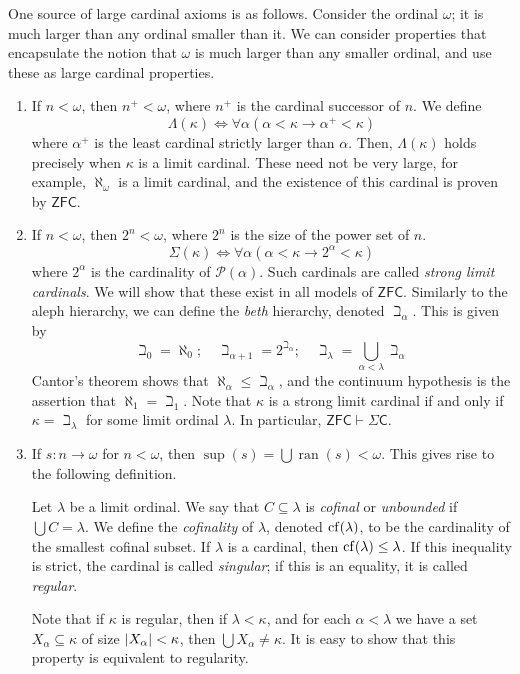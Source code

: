 One source of large cardinal axioms is as follows.
Consider the ordinal \( \omega \); it is much larger than any ordinal smaller than it.
We can consider properties that encapsulate the notion that \( \omega \) is much larger than any smaller ordinal, and use these as large cardinal properties.

\begin{enumerate}
    \item If \( n < \omega \), then \( n^+ < \omega \), where \( n^+ \) is the cardinal successor of \( n \).
    We define
    \[ \Lambda(\kappa) \iff \forall \alpha (\alpha < \kappa \to \alpha^+ < \kappa) \]
    where \( \alpha^+ \) is the least cardinal strictly larger than \( \alpha \).
    Then, \( \Lambda(\kappa) \) holds precisely when \( \kappa \) is a limit cardinal.
    These need not be very large, for example, \( \aleph_\omega \) is a limit cardinal, and the existence of this cardinal is proven by \( \mathsf{ZFC} \).
    \item If \( n < \omega \), then \( 2^n < \omega \), where \( 2^n \) is the size of the power set of \( n \).
    \[ \Sigma(\kappa) \iff \forall \alpha (\alpha < \kappa \to 2^\alpha < \kappa) \]
    where \( 2^\alpha \) is the cardinality of \( \mathcal P(\alpha) \).
    Such cardinals are called \emph{strong limit cardinals}.
    We will show that these exist in all models of \( \mathsf{ZFC} \).
    Similarly to the aleph hierarchy, we can define the \emph{beth} hierarchy, denoted \( \beth_\alpha \).
    This is given by
    \[ \beth_0 = \aleph_0;\quad \beth_{\alpha + 1} = 2^{\beth_\alpha};\quad \beth_{\lambda} = \bigcup_{\alpha < \lambda} \beth_\alpha \]
    Cantor's theorem shows that \( \aleph_\alpha \leq \beth_\alpha \), and the continuum hypothesis is the assertion that \( \aleph_1 = \beth_1 \).
    Note that \( \kappa \) is a strong limit cardinal if and only if \( \kappa = \beth_\lambda \) for some limit ordinal \( \lambda \).
    In particular, \( \mathsf{ZFC} \vdash \Sigma \mathsf{C} \).
    \item If \( s : n \to \omega \) for \( n < \omega \), then \( \sup(s) = \bigcup \operatorname{ran}(s) < \omega \).
    This gives rise to the following definition.
    \begin{definition}
        Let \( \lambda \) be a limit ordinal.
        We say that \( C \subseteq \lambda \) is \emph{cofinal} or \emph{unbounded} if \( \bigcup C = \lambda \).
        We define the \emph{cofinality} of \( \lambda \), denoted \( \operatorname{cf}(\lambda) \), to be the cardinality of the smallest cofinal subset.
        If \( \lambda \) is a cardinal, then \( \operatorname{cf}(\lambda) \leq \lambda \).
        If this inequality is strict, the cardinal is called \emph{singular}; if this is an equality, it is called \emph{regular}.
    \end{definition}
    Note that if \( \kappa \) is regular, then if \( \lambda < \kappa \), and for each \( \alpha < \lambda \) we have a set \( X_\alpha \subseteq \kappa \) of size \( \abs{X_\alpha} < \kappa \), then \( \bigcup X_\alpha \neq \kappa \).
    It is easy to show that this property is equivalent to regularity.


\end{enumerate}
